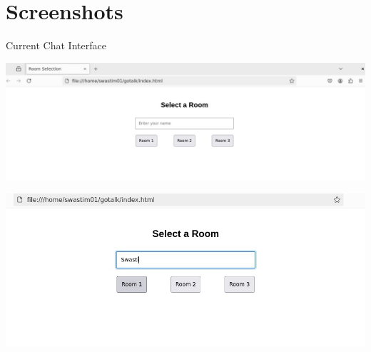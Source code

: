 \documentclass{beamer}
\begin{document}
\section{Screenshots}
\begin{frame}{Current Chat Interface}
        \begin{minipage}[t]{0.5\textwidth}
            \centering
            \includegraphics[width=\textwidth]{Pictures/room created.jpg}
        \end{minipage}
        \hfill
        \begin{minipage}[t]{0.5\textwidth}
            \centering
            \includegraphics[width=\textwidth]{Pictures/nameinsertion.jpg}
        \end{minipage}
\end{frame}
\end{document}
